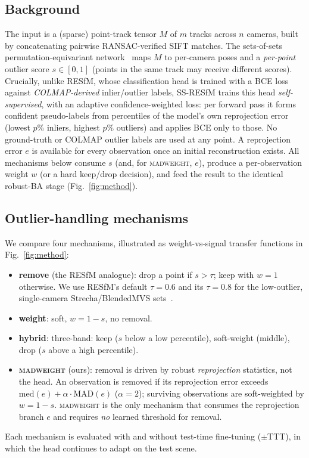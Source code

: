 \documentclass[10pt,twocolumn,letterpaper]{article}
\newcommand{\mad}{\textsc{madweight}}
\begin{document}
\subsection{Background}
The input is a (sparse) point-track tensor $M$ of $m$ tracks across $n$ cameras, built by
concatenating pairwise RANSAC-verified SIFT matches. The sets-of-sets permutation-equivariant
network~\citep{resfm,esfm} maps $M$ to per-camera poses and a \emph{per-point} outlier score
$s\in[0,1]$ (points in the same track may receive different scores). Crucially, unlike RESfM,
whose classification head is trained with a BCE loss against \emph{COLMAP-derived}
inlier/outlier labels, SS-RESfM trains this head \emph{self-supervised}, with an adaptive
confidence-weighted loss: per forward pass it forms confident pseudo-labels from percentiles
of the model's own reprojection error (lowest $p$\% inliers, highest $p$\% outliers) and
applies BCE only to those. No ground-truth or COLMAP outlier labels are used at any point.
A reprojection error $e$ is available for every observation once an initial reconstruction
exists. All mechanisms below consume $s$ (and, for \mad{}, $e$),
produce a per-observation weight $w$ (or a hard keep/drop decision), and feed the result to
the identical robust-BA stage (Fig.~\ref{fig:method}).

\subsection{Outlier-handling mechanisms}
We compare four mechanisms, illustrated as weight-vs-signal transfer functions in
Fig.~\ref{fig:method}:
\begin{itemize}\itemsep2pt
\item\textbf{remove} (the RESfM analogue): drop a point if $s>\tau$; keep with $w{=}1$
otherwise. We use RESfM's default $\tau{=}0.6$ and its $\tau{=}0.8$ for the low-outlier,
single-camera Strecha/BlendedMVS sets~\citep{resfm}.
\item\textbf{weight}: soft, $w=1-s$, no removal.
\item\textbf{hybrid}: three-band: keep ($s$ below a low percentile), soft-weight (middle),
drop ($s$ above a high percentile).
\item\textbf{\mad{}} (ours): removal is driven by robust \emph{reprojection} statistics, not
the head. An observation is removed if its reprojection error exceeds
$\mathrm{med}(e)+\alpha\cdot\mathrm{MAD}(e)$ ($\alpha{=}2$); surviving observations are
soft-weighted by $w=1-s$. \mad{} is the only mechanism that consumes the reprojection
branch $e$ and requires \emph{no} learned threshold for removal.
\end{itemize}
Each mechanism is evaluated with and without test-time fine-tuning ($\pm$TTT), in which the
head continues to adapt on the test scene.
\end{document}
